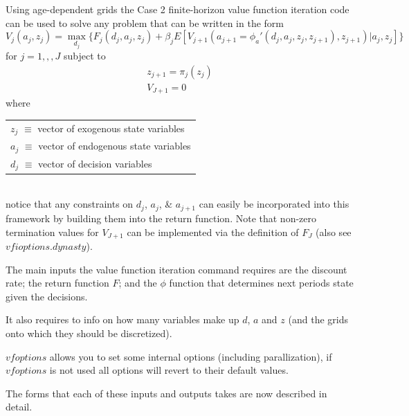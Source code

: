 Using age-dependent grids the Case 2 finite-horizon value function iteration code can be used to solve any problem that can be written in the form
\begin{equation*}
 V_j(a_j,z_j)= \max_{d_j} \{ F_j(d_j,a_j,z_j) + \beta_j E[V_{j+1}(a_{j+1}=\phi_a'(d_j,a_j,z_j,z_{j+1}),z_{j+1})|a_j,z_j] \}
\end{equation*}
for $j=1,,,J$ subject to
\begin{eqnarray*}
 z_{j+1}=\pi_j(z_j) \\
 V_{J+1}=0
\end{eqnarray*}
where \\
\begin{tabular} {l}
 $z_j$ $\equiv$ vector of exogenous state variables \\
 $a_j$ $\equiv$ vector of endogenous state variables \\
 $d_j$ $\equiv$ vector of decision variables
\end{tabular} \\
notice that any constraints on $d_j$, $a_j$, \& $a_{j+1}$ can easily be incorporated into this framework by building them into the return function.
Note that non-zero termination values for $V_{J+1}$ can be implemented via the definition of $F_J$ (also see $vfioptions.dynasty$).

The main inputs the value function iteration command requires are the discount rate; the return function $F$; and the $\phi$ function that determines next periods state given the decisions.

It also requires to info on how many variables make up $d$, $a$ and $z$ (and the grids onto which they should be discretized).

$vfoptions$ allows you to set some internal options (including parallization), if $vfoptions$ is not used all options will revert to their default values.

The forms that each of these inputs and outputs takes are now described in detail.

